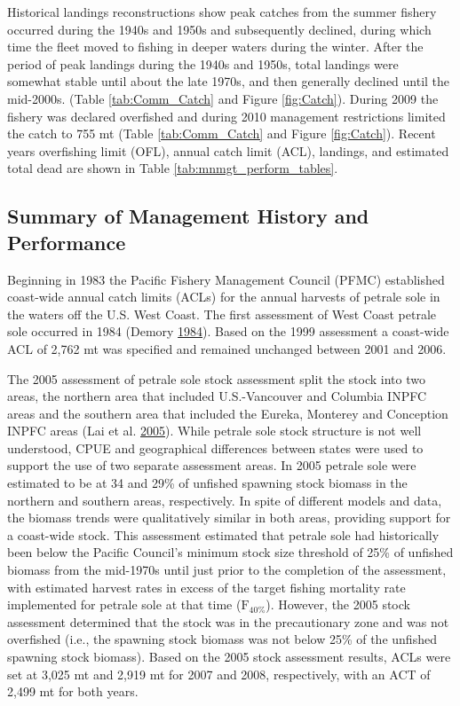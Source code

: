 \documentclass[12pt,]{article}
\begin{document}
Historical landings reconstructions show peak catches from the summer
fishery occurred during the 1940s and 1950s and subsequently declined,
during which time the fleet moved to fishing in deeper waters during the
winter. After the period of peak landings during the 1940s and 1950s,
total landings were somewhat stable until about the late 1970s, and then
generally declined until the mid-2000s. (Table \ref{tab:Comm_Catch} and
Figure \ref{fig:Catch}). During 2009 the fishery was declared overfished
and during 2010 management restrictions limited the catch to 755 mt
(Table \ref{tab:Comm_Catch} and Figure \ref{fig:Catch}). Recent years
overfishing limit (OFL), annual catch limit (ACL), landings, and
estimated total dead are shown in Table \ref{tab:mnmgt_perform_tables}.

\subsection{Summary of Management History and
Performance}\label{summary-of-management-history-and-performance}

Beginning in 1983 the Pacific Fishery Management Council (PFMC)
established coast-wide annual catch limits (ACLs) for the annual
harvests of petrale sole in the waters off the U.S. West Coast. The
first assessment of West Coast petrale sole occurred in 1984 (Demory
\protect\hyperlink{ref-demory_progress_1984}{1984}). Based on the 1999
assessment a coast-wide ACL of 2,762 mt was specified and remained
unchanged between 2001 and 2006.

The 2005 assessment of petrale sole stock assessment split the stock
into two areas, the northern area that included U.S.-Vancouver and
Columbia INPFC areas and the southern area that included the Eureka,
Monterey and Conception INPFC areas (Lai et al.
\protect\hyperlink{ref-lai_stock_2005}{2005}). While petrale sole stock
structure is not well understood, CPUE and geographical differences
between states were used to support the use of two separate assessment
areas. In 2005 petrale sole were estimated to be at 34 and 29\% of
unfished spawning stock biomass in the northern and southern areas,
respectively. In spite of different models and data, the biomass trends
were qualitatively similar in both areas, providing support for a
coast-wide stock. This assessment estimated that petrale sole had
historically been below the Pacific Council's minimum stock size
threshold of 25\% of unfished biomass from the mid-1970s until just
prior to the completion of the assessment, with estimated harvest rates
in excess of the target fishing mortality rate implemented for petrale
sole at that time (\(\text{F}_{40\%}\)). However, the 2005 stock
assessment determined that the stock was in the precautionary zone and
was not overfished (i.e., the spawning stock biomass was not below 25\%
of the unfished spawning stock biomass). Based on the 2005 stock
assessment results, ACLs were set at 3,025 mt and 2,919 mt for 2007 and
2008, respectively, with an ACT of 2,499 mt for both years.
\end{document}
